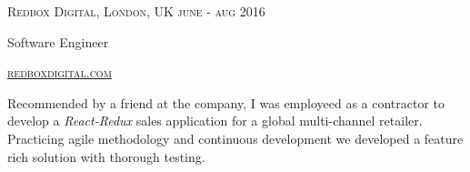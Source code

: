{
  \textsc{\small{Redbox Digital, London, UK
    \hfill
      {\raggedleft
        june - aug 2016
      } \\
    }
  }
  {\raggedright\large {
      Software Engineer
  }}

  \textsc{\small\href{http://www.redboxdigital.com}{redboxdigital.com}}

  \normalsize{\raggedright
    Recommended by a friend at the company, I was employeed as a contractor to develop a \emph{React-Redux} sales application for a global multi-channel retailer. Practicing agile methodology and continuous development we developed a feature rich solution with thorough testing. 
  }
}
